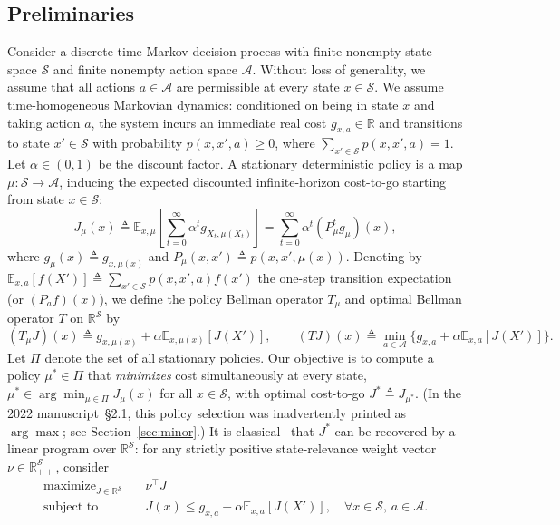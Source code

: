 \documentclass[11pt,letterpaper]{article}
\newcommand{\E}{\mathbb{E}}
\newcommand{\R}{\mathbb{R}}
\newcommand{\defeq}{\triangleq}
\theoremstyle{definition}
\begin{document}
\subsection{Preliminaries}
\label{sec:preliminaries}

Consider a discrete-time Markov decision process with finite nonempty state space $\mathcal{S}$ and finite nonempty action space $\mathcal{A}$. Without loss of generality, we assume that all actions $a\in\mathcal{A}$ are permissible at every state $x\in\mathcal{S}$. We assume time-homogeneous Markovian dynamics: conditioned on being in state $x$ and taking action $a$, the system incurs an immediate real cost $g_{x,a}\in\R$ and transitions to state $x'\in\mathcal{S}$ with probability $p(x,x',a)\ge 0$, where $\sum_{x'\in\mathcal{S}} p(x,x',a) = 1$. Let $\alpha \in (0,1)$ be the discount factor. A stationary deterministic policy is a map $\mu:\mathcal{S}\to\mathcal{A}$, inducing the expected discounted infinite-horizon cost-to-go starting from state $x\in\mathcal{S}$:
\[
 J_\mu(x) \defeq \E_{x,\mu}\left[\sum_{t=0}^{\infty} \alpha^t g_{X_t,\mu(X_t)}\right]
 = \sum_{t=0}^\infty \alpha^t (P_\mu^t g_\mu)(x),
\]
where $g_\mu(x) \defeq g_{x,\mu(x)}$ and $P_\mu(x,x') \defeq p(x,x',\mu(x))$. Denoting by $\E_{x,a}[f(X')] \defeq \sum_{x'\in\mathcal{S}} p(x,x',a)f(x')$ the one-step transition expectation (or $(P_a f)(x)$), we define the policy Bellman operator $T_\mu$ and optimal Bellman operator $T$ on $\R^{\mathcal{S}}$ by
\begin{equation}
 (T_\mu J)(x) \defeq g_{x,\mu(x)} + \alpha \E_{x,\mu(x)}[J(X')], \qquad
 (TJ)(x) \defeq \min_{a\in\mathcal{A}} \bigl\{ g_{x,a} + \alpha \E_{x,a}[J(X')] \bigr\}.
 \tag{3}\label{eq:3}
\end{equation}
Let $\Pi$ denote the set of all stationary policies. Our objective is to compute a policy $\mu^*\in\Pi$ that \emph{minimizes} cost simultaneously at every state, $\mu^* \in \arg\min_{\mu\in\Pi} J_\mu(x)$ for all $x\in\mathcal{S}$, with optimal cost-to-go $J^* \defeq J_{\mu^*}$. (In the 2022 manuscript~\S2.1, this policy selection was inadvertently printed as $\arg\max$; see Section~\ref{sec:minor}.) It is classical~\cite{Manne60} that $J^*$ can be recovered by a linear program over $\R^{\mathcal{S}}$: for any strictly positive state-relevance weight vector $\nu \in \R_{++}^{\mathcal{S}}$, consider
\begin{equation}
\begin{aligned}
 \text{maximize}_{J\in\R^{\mathcal{S}}}\quad & \nu^\top J \\
 \text{subject to}\quad & J(x) \le g_{x,a} + \alpha \E_{x,a}[J(X')], \quad \forall x\in\mathcal{S},\, a\in\mathcal{A}.
\end{aligned}
\tag{1}\label{eq:1}
\end{equation}
\end{document}
